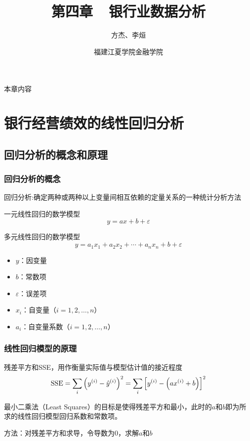 \documentclass[t]{beamer}
\begin{document}
\fontsize{11}{18}\selectfont


\CTEXindent



  \title{第四章~~银行业数据分析}
\author{方杰、李烜}
\date{福建江夏学院金融学院}
  \begin{frame}
    \maketitle
  \end{frame}

\begin{frame}{本章内容}

    \tableofcontents
\end{frame}

\section{银行经营绩效的线性回归分析}
\subsection{回归分析的概念和原理}
\begin{frame}    \frametitle{回归分析的概念}
  回归分析:确定两种或两种以上变量间相互依赖的定量关系的一种统计分析方法

  一元线性回归的数学模型
\[y=ax+b+\varepsilon\]

  多元线性回归的数学模型
  \[y=a_1x_1+a_2x_2+\cdots+a_nx_n+b+\varepsilon\]
\begin{multicols*}{2}
  \begin{itemize}
  \item $y$：因变量
\item $b$：常数项
  \item $\varepsilon$：误差项
  \item $x_i$：自变量（$i=1,2,\ldots,n$）
  \item $a_i$：自变量系数（$i=1,2,\ldots,n$）
\end{itemize}
\end{multicols*}


\end{frame}


\begin{frame}
    \frametitle{线性回归模型的原理}
    残差平方和SSE，用作衡量实际值与模型估计值的接近程度
    \[{\rm SSE}= \sum_i \left(y^{(i)}-\hat y^{(i)}\right)^2=\sum_i \left[y^{(i)}-\left(ax^{(i)}+b\right)\right]^2 \]

    最小二乘法（Least Squares）的目标是使得残差平方和最小，此时的$a$和$b$即为所求的线性回归模型回归系数和常数项。

    方法：对残差平方和求导，令导数为0，求解$a$和$b$  
\end{frame}
\end{document}
